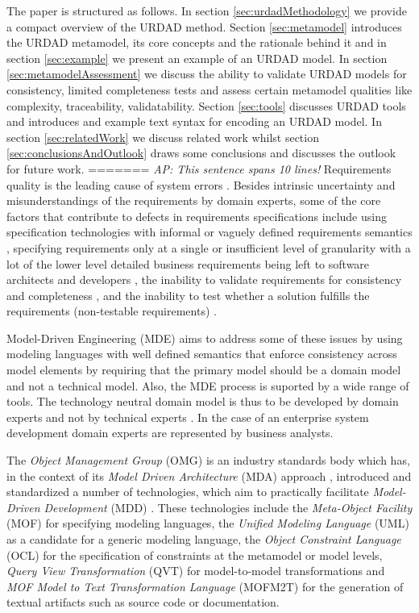 The paper is structured as follows. In section \ref{sec:urdadMethodology} we provide a compact overview of the URDAD method. Section \ref{sec:metamodel} introduces the URDAD metamodel, its core concepts and the rationale behind it and in section \ref{sec:example} we present an example of an URDAD model. In section \ref{sec:metamodelAssessment} we discuss  the ability to validate URDAD models for consistency, limited completeness tests and assess certain metamodel qualities like complexity, traceability, validatability. Section \ref{sec:tools} discusses URDAD tools and introduces and example text syntax for encoding an URDAD model. In section \ref{sec:relatedWork} we discuss related work whilst section \ref{sec:conclusionsAndOutlook} draws some conclusions and discusses the outlook for future work.
=======
\emph{AP: This sentence spans 10 lines!}
Requirements quality is the leading cause of system errors \cite{heck_experiences_2008}. Besides intrinsic uncertainty and misunderstandings of the requirements by domain experts, some of the core factors that contribute to defects in requirements specifications include using specification technologies with informal or vaguely defined requirements semantics \cite{ferguson_empirical_2006}, specifying requirements only at a single or insufficient level of granularity with a lot of the lower level detailed business requirements being left to software architects and developers
\cite{espana_evaluating_2009,getBetterReference}, the inability to validate requirements for consistency and completeness \cite{somebodyPleaseFindASuitableReference}, and the inability to test whether a solution fulfills the requirements (non-testable requirements) \cite{bashardoust-tajali_extracting_2008}.

Model-Driven Engineering (MDE) \cite{} aims to address some of these issues by using modeling languages with well defined semantics that enforce consistency across model elements by requiring that the primary model should be a domain model and not a technical model\cite{asnina_computation_2010}. Also, the MDE process is suported by a wide range of tools. The technology neutral domain model is thus to be developed by domain experts and not by technical experts \cite{asnina_computation_2010}. In the case of an enterprise system development domain experts are represented by business analysts.

The {\em Object Management Group} (OMG) \cite{} is an industry standards body which has, in the context of its {\em Model Driven Architecture} (MDA) approach \cite{siegel_developing_2001}, introduced and standardized a number of technologies, which aim to practically facilitate {\em Model-Driven Development} (MDD) \cite{}. These technologies include the {\em Meta-Object Facility} (MOF) \cite{} for specifying modeling languages, the {\em Unified Modeling Language} (UML) \cite{} as a candidate for a generic modeling language, the {\em Object Constraint Language} (OCL) for the specification of constraints at the metamodel or model levels, {\em Query View Transformation} (QVT) for model-to-model transformations and {\em MOF Model to Text Transformation Language} (MOFM2T) for the generation of textual artifacts such as source code or documentation.

